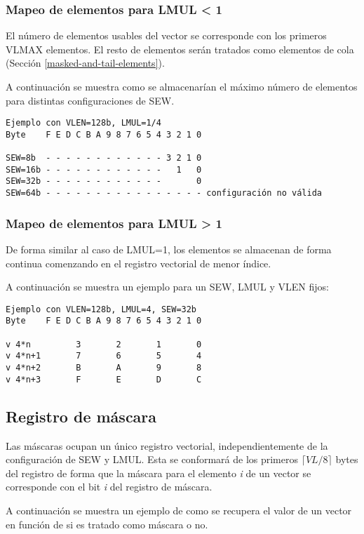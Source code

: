 \subsubsection{Mapeo de elementos para LMUL < 1}
El número de elementos usables del vector se corresponde con los primeros VLMAX
elementos. El resto de elementos serán tratados como elementos de cola
(Sección \ref{masked-and-tail-elements}).

A continuación se muestra como se almacenarían el máximo número de elementos
para distintas configuraciones de SEW.
\begin{lstlisting}
Ejemplo con VLEN=128b, LMUL=1/4
Byte    F E D C B A 9 8 7 6 5 4 3 2 1 0

SEW=8b  - - - - - - - - - - - - 3 2 1 0
SEW=16b - - - - - - - - - - - -   1   0
SEW=32b - - - - - - - - - - - -       0
SEW=64b - - - - - - - - - - - - - - - - configuración no válida
\end{lstlisting}


\subsubsection{Mapeo de elementos para LMUL > 1}
De forma similar al caso de LMUL=1, los elementos se almacenan de forma
continua comenzando en el registro vectorial de menor índice.

A continuación se muestra un ejemplo para un SEW, LMUL y VLEN fijos:
\begin{lstlisting}
Ejemplo con VLEN=128b, LMUL=4, SEW=32b
Byte    F E D C B A 9 8 7 6 5 4 3 2 1 0

v 4*n         3       2       1       0
v 4*n+1       7       6       5       4 
v 4*n+2       B       A       9       8
v 4*n+3       F       E       D       C 
\end{lstlisting}

\subsection{Registro de máscara}{\label{mask-reg}}
Las máscaras ocupan un único registro vectorial, independientemente de la
configuración de SEW y LMUL. Esta se conformará de los primeros $\lceil
VL/8\rceil$ bytes del registro de forma que la máscara para el elemento
\textit{i} de un vector se corresponde con el bit \textit{i} del registro de
máscara.

A continuación se muestra un ejemplo de como se recupera el
valor de un vector en función de si es tratado como máscara o no.

